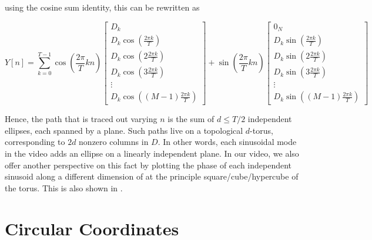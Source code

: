 \documentclass[a4paper,UKenglish]{lipics}
\begin{document}
using the cosine sum identity, this can be rewritten as

\begin{equation}
Y[n] = \sum_{k = 0}^{T-1} \cos \left( \frac{2 \pi}{T} k n \right) \left[ \begin{array}{c} D_k \\ D_k \cos \left( \frac{2 \pi k}{T} \right) \\ D_k \cos \left( 2 \frac{2 \pi k}{T} \right) \\ D_k \cos \left( 3 \frac{2 \pi k}{T} \right) \\ \vdots \\ D_k \cos \left( (M-1) \frac{2 \pi k}{T} \right) \end{array} \right] + \sin \left( \frac{2 \pi}{T} k n \right) \left[ \begin{array}{c} 0_N \\ D_k \sin \left( \frac{2 \pi k}{T} \right) \\ D_k \sin \left( 2 \frac{2 \pi k}{T} \right) \\ D_k \sin \left( 3 \frac{2 \pi k}{T} \right) \\ \vdots \\ D_k \sin \left( (M-1) \frac{2 \pi k}{T} \right) \end{array} \right]
\end{equation}



Hence, the path that is traced out varying $n$ is the sum of $d \leq T/2$ independent ellipses, each spanned by a plane.  Such paths live on a topological $d$-torus, corresponding to $2d$ nonzero columns in $D$.  In other words, each sinusoidal mode in the video adds an ellipse on a linearly independent plane.  In our video, we also offer another perspective on this fact by plotting the phase of each independent sinusoid along a different dimension of at the principle square/cube/hypercube of the torus.  This is also shown in \cite{perea2013sliding}.


\section{Circular Coordinates}
\end{document}
